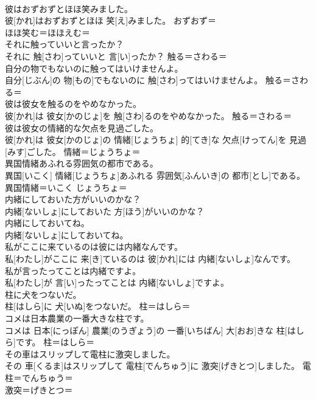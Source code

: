 \documentclass[8pt]{extreport}
\begin{document}
\begin{CJK}{UTF8}{min}
\\	彼はおずおずとほほ笑みました。	
\\	彼[かれ]はおずおずとほほ 笑[え]みました。	おずおず＝ 
\\	ほほ笑む＝ほほえむ＝ 
\\	それに触っていいと言ったか？	
\\	それに 触[さわ]っていいと 言[い]ったか？	触る＝さわる＝ 
\\	自分の物でもないのに触ってはいけませんよ。	
\\	自分[じぶん]の 物[もの]でもないのに 触[さわ]ってはいけませんよ。	触る＝さわる＝ 
\\	彼は彼女を触るのをやめなかった。	
\\	彼[かれ]は 彼女[かのじょ]を 触[さわ]るのをやめなかった。	触る＝さわる＝ 
\\	彼は彼女の情緒的な欠点を見過ごした。	
\\	彼[かれ]は 彼女[かのじょ]の 情緒[じょうちょ] 的[てき]な 欠点[けってん]を 見過[みす]ごした。	情緒＝じょうちょ＝ 
\\	異国情緒あふれる雰囲気の都市である。	
\\	異国[いこく] 情緒[じょうちょ]あふれる 雰囲気[ふんいき]の 都市[とし]である。	異国情緒＝いこく じょうちょ＝ 
\\	内緒にしておいた方がいいのかな？	
\\	内緒[ないしょ]にしておいた 方[ほう]がいいのかな？	
\\	内緒にしておいてね。	
\\	内緒[ないしょ]にしておいてね。	
\\	私がここに来ているのは彼には内緒なんです。	
\\	私[わたし]がここに 来[き]ているのは 彼[かれ]には 内緒[ないしょ]なんです。	
\\	私が言ったってことは内緒ですよ。	
\\	私[わたし]が 言[い]ったってことは 内緒[ないしょ]ですよ。	
\\	柱に犬をつないだ。	
\\	柱[はしら]に 犬[いぬ]をつないだ。	柱＝はしら＝ 
\\	コメは日本農業の一番大きな柱です。	
\\	コメは 日本[にっぽん] 農業[のうぎょう]の 一番[いちばん] 大[おお]きな 柱[はしら]です。	柱＝はしら＝ 
\\	その車はスリップして電柱に激突しました。	
\\	その 車[くるま]はスリップして 電柱[でんちゅう]に 激突[げきとつ]しました。	電柱＝でんちゅう＝ 
\\	激突＝げきとつ＝ 

\end{CJK}
\end{document}
